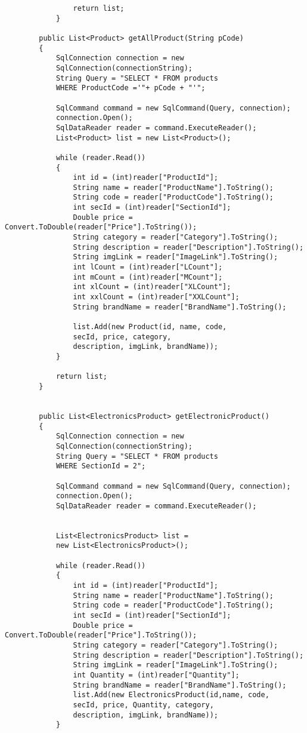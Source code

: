 \begin{lstlisting}
                return list;
            }

        public List<Product> getAllProduct(String pCode)
        {
            SqlConnection connection = new 
            SqlConnection(connectionString);
            String Query = "SELECT * FROM products 
            WHERE ProductCode ='"+ pCode + "'";

            SqlCommand command = new SqlCommand(Query, connection);
            connection.Open();
            SqlDataReader reader = command.ExecuteReader();
            List<Product> list = new List<Product>();

            while (reader.Read())
            {
                int id = (int)reader["ProductId"];
                String name = reader["ProductName"].ToString();
                String code = reader["ProductCode"].ToString();
                int secId = (int)reader["SectionId"];
                Double price = Convert.ToDouble(reader["Price"].ToString());
                String category = reader["Category"].ToString();
                String description = reader["Description"].ToString();
                String imgLink = reader["ImageLink"].ToString();
                int lCount = (int)reader["LCount"];
                int mCount = (int)reader["MCount"];
                int xlCount = (int)reader["XLCount"];
                int xxlCount = (int)reader["XXLCount"];
                String brandName = reader["BrandName"].ToString();

                list.Add(new Product(id, name, code,
                secId, price, category, 
                description, imgLink, brandName));
            }

            return list;
        }


        public List<ElectronicsProduct> getElectronicProduct()
        {
            SqlConnection connection = new
            SqlConnection(connectionString);
            String Query = "SELECT * FROM products 
            WHERE SectionId = 2";

            SqlCommand command = new SqlCommand(Query, connection);
            connection.Open();
            SqlDataReader reader = command.ExecuteReader();


            List<ElectronicsProduct> list =
            new List<ElectronicsProduct>();

            while (reader.Read())
            {
                int id = (int)reader["ProductId"];
                String name = reader["ProductName"].ToString();
                String code = reader["ProductCode"].ToString();
                int secId = (int)reader["SectionId"];
                Double price = Convert.ToDouble(reader["Price"].ToString());
                String category = reader["Category"].ToString();
                String description = reader["Description"].ToString();
                String imgLink = reader["ImageLink"].ToString();
                int Quantity = (int)reader["Quantity"];
                String brandName = reader["BrandName"].ToString();
                list.Add(new ElectronicsProduct(id,name, code,
                secId, price, Quantity, category,
                description, imgLink, brandName));
            }


\end{lstlisting}
